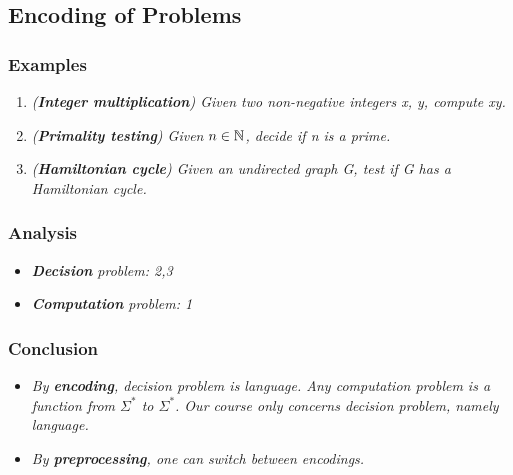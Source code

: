 \documentclass{article}
\begin{document}
\subsection{Encoding of Problems}

\subsubsection{Examples}

\begin{enumerate}
    \item \textit{(\textbf{Integer multiplication}) Given two non-negative integers x, y, compute xy.}
    \item \textit{(\textbf{Primality testing}) Given $n \in \mathbb{N}$, decide if n is a prime.}
    \item \textit{(\textbf{Hamiltonian cycle}) Given an undirected graph G, test if G has a Hamiltonian cycle.}
\end{enumerate}

\subsubsection{Analysis}

\begin{itemize}
    \item \textit{\textbf{Decision} problem: 2,3}
    \item \textit{\textbf{Computation} problem: 1}
\end{itemize}

\subsubsection{Conclusion}
\begin{itemize}
    \item \textit{By \textbf{encoding}, decision problem is language. Any computation problem is a function from $\Sigma^*$ to $\Sigma^*$. Our course only concerns decision problem, namely language.}
    \item \textit{By \textbf{preprocessing}, one can switch between encodings.}
\end{itemize}
\end{document}

